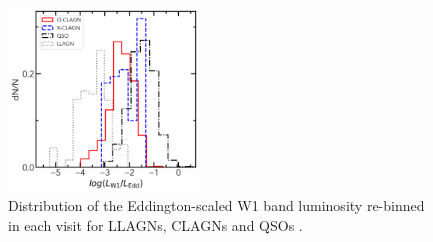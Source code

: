 \documentclass[linenumbers]{aastex631}
\begin{document}

\begin{figure}
\centering
	\includegraphics[width=0.45\textwidth]{pic/WISE_LW1_Ledd_hist_rebin_OX.png}
    \caption{Distribution of the Eddington-scaled W1 band luminosity re-binned in each visit for LLAGNs\citep{2009MNRAS.399..349G}, CLAGNs and QSOs \citep{2007ApJ...667..131G}. }
    \label{fig:distribution_ledd}
\end{figure}
\end{document}
